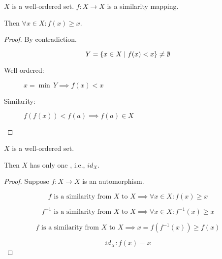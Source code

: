 \begin{frame}{}
  \begin{lemma}
    $X$ is a well-ordered set. $f: X \to X$ is a similarity mapping.

    Then $\forall x \in X: f(x) \ge x$.
  \end{lemma}

  \vspace{0.50cm}
  \begin{proof}
    \pause
    \centerline{By contradiction.}

    \pause
    \[
      Y = \{x \in X \mid f(x) < x\} \neq \emptyset
    \]

    \pause
    \vspace{0.20cm}
    \begin{description}
      \item[Well-ordered:] $x = \min\, Y \implies f(x) < x$ 
      \pause
      \item[Similarity:] $f(f(x)) < f(a) \implies f(a) \in X$
    \end{description}
  \end{proof}
\end{frame}

\begin{frame}{}
  \begin{lemma}
    $X$ is a well-ordered set. 

    Then $X$ has only one , i.e., $id_X$.
  \end{lemma}

  \vspace{0.50cm}
  \begin{proof}
    \pause
    \centerline{Suppose $f: X \to X$ is an automorphism.}

    \pause
    \[
      f \text{ is a similarity from $X$ to $X$} \implies \forall x \in X: f(x) \ge x
    \]

    \pause
    \[
      f^{-1} \text{ is a similarity from $X$ to $X$} \implies \forall x \in X: f^{-1}(x) \ge x
    \]

    \pause
    \[
      f \text{ is a similarity from $X$ to $X$} \implies x = f(f^{-1}(x)) \ge f(x)
    \]

    \pause
    \[
      id_X: f(x) = x
    \]
  \end{proof}
\end{frame}

